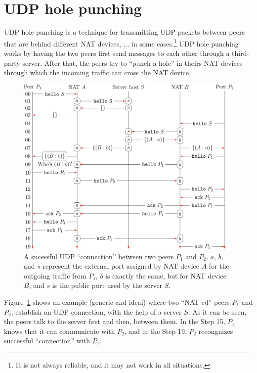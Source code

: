 \section{UDP hole punching}

UDP hole punching is a technique for transmitting UDP packets between
peers that are behind different NAT devices, ... in some
cases.\footnote{It is not always reliable, and it may not work in all
  situations.} UDP hole punching works by having the two peers first
send messages to each other through a third-party server. After that,
the peers try to ``punch a hole'' in theirs NAT devices through which
the incoming traffic can cross the NAT device.

\begin{figure}
  \includegraphics{graphics/UDP_Hole_Punching_RCN}
  \caption{A sucessful UDP ``connection'' between two peers $P_1$ and
    $P_2$. $a$, $b$, and $s$ represent the external port assigned by
    NAT device $A$ for the outgoing traffic from $P_1$, $b$ is exactly
    the same, but for NAT device $B$, and $s$ is the public port used
    by the server $S$.}
  \label{fig:UHP}
\end{figure}

Figure~\ref{fig:UHP} shows an example (generic and ideal) where two
``NAT-ed'' peers $P_1$ and $P_2$, establish an UDP connection, with
the help of a server $S$. As it can be seen, the peers talk to the
server first and then, between them. In the Step 15, $P_1$ knows that
it can communicate with $P_2$, and in the Step 19, $P_2$ recongnizes
successful ``connection'' with $P_1$.



